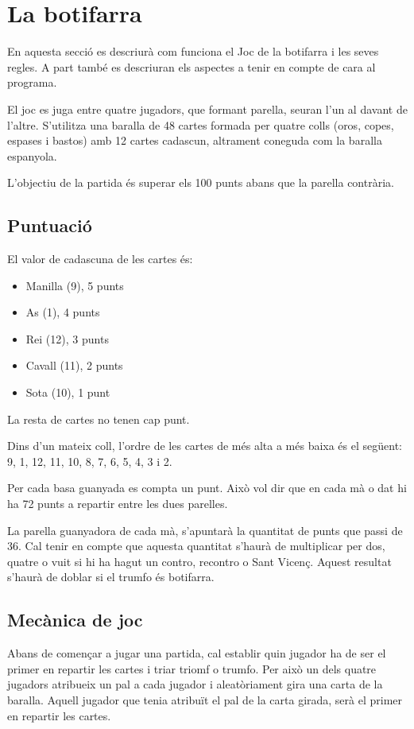 \chapter{La botifarra}

En aquesta secció es descriurà com funciona el Joc de la botifarra i les seves regles. A part també es descriuran els aspectes a tenir en compte de cara al programa. 


El joc es juga entre quatre jugadors, que formant parella, seuran l'un al davant de l'altre. S'utilitza una baralla de 48 cartes formada per quatre colls (oros, copes, espases i bastos) amb 12 cartes cadascun, altrament coneguda com la baralla espanyola.


L'objectiu de la partida és superar els 100 punts abans que la parella contrària. 


\section{Puntuació}

El valor de cadascuna de les cartes és:
\begin{itemize}
	\item{Manilla (9), 5 punts}
    \item{As (1), 4 punts}
    \item{Rei (12), 3 punts}
    \item{Cavall (11), 2 punts}
    \item{Sota (10), 1 punt}
\end{itemize}

La resta de cartes no tenen cap punt.
    
Dins d'un mateix coll, l'ordre de les cartes de més alta a més baixa és el següent: 9, 1, 12, 11, 10, 8, 7, 6, 5, 4, 3 i 2.

Per cada basa guanyada es compta un punt. Això vol dir que en cada mà o dat hi ha 72 punts a repartir entre les dues parelles.

La parella guanyadora de cada mà, s'apuntarà la quantitat de punts que passi de 36. Cal tenir en compte que aquesta quantitat s'haurà de multiplicar per dos, quatre o vuit si hi ha hagut un contro, recontro o Sant Vicenç. Aquest resultat s'haurà de doblar si el trumfo és botifarra.

\section{Mecànica de joc}

Abans de començar a jugar una partida, cal establir quin jugador ha de ser el primer en repartir les cartes i triar triomf o trumfo. Per això un dels quatre jugadors atribueix un pal a cada jugador i aleatòriament gira una carta de la baralla. Aquell jugador que tenia atribuït el pal de la carta girada, serà el primer en repartir les cartes.




